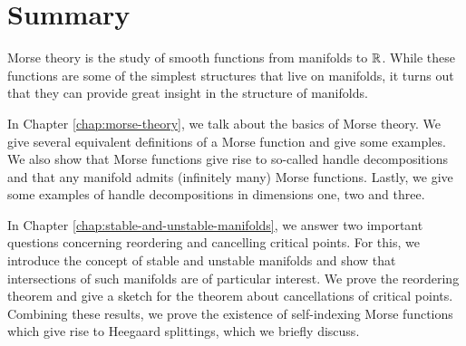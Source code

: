 \chapter*{Summary}
\label{ch:summary}

Morse theory is the study of smooth functions from manifolds to $\mathbb{R}$. While these functions are some of the simplest structures that live on manifolds, it turns out that they can provide great insight in the structure of manifolds.

In Chapter \ref{chap:morse-theory}, we talk about the basics of Morse theory.
We give several equivalent definitions of a Morse function and give some examples.
We also show that Morse functions give rise to so-called handle decompositions and that any manifold admits (infinitely many) Morse functions.
Lastly, we give some examples of handle decompositions in dimensions one, two and three.

In Chapter \ref{chap:stable-and-unstable-manifolds}, we answer two important questions concerning reordering and cancelling critical points.
For this, we introduce the concept of stable and unstable manifolds and show that intersections of such manifolds are of particular interest.
We prove the reordering theorem and give a sketch for the theorem about cancellations of critical points.
Combining these results, we prove the existence of self-indexing Morse functions which give rise to Heegaard splittings, which we briefly discuss.
